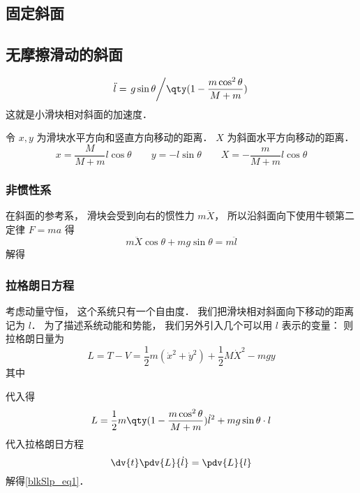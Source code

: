 
\subsection{固定斜面}

\subsection{无摩擦滑动的斜面}
\begin{equation}\label{blkSlp_eq1}
\ddot l = \left.g\sin\theta\middle/\qty(1 - \frac{m\cos^2\theta}{M + m})\right.
\end{equation}
这就是小滑块相对斜面的加速度．

令 $x, y$ 为滑块水平方向和竖直方向移动的距离． $X$ 为斜面水平方向移动的距离．
\begin{equation}
x = \frac{M}{M + m}l\cos\theta
\qquad
y = -l\sin\theta
\qquad
X = -\frac{m}{M + m}l\cos\theta
\end{equation}

\subsubsection{非惯性系}
在斜面的参考系， 滑块会受到向右的惯性力 $m\ddot X$， 所以沿斜面向下使用牛顿第二定律 $F = ma$ 得
\begin{equation}
m\ddot X\cos\theta + mg\sin\theta = m\ddot l
\end{equation}
解得

\subsubsection{拉格朗日方程}
考虑动量守恒， 这个系统只有一个自由度． 我们把滑块相对斜面向下移动的距离记为 $l$． 为了描述系统动能和势能， 我们另外引入几个可以用 $l$ 表示的变量：  则拉格朗日量为
\begin{equation}
L = T - V = \frac12 m(\dot x^2 + \dot y^2) + \frac12 M \dot X^2 - mgy
\end{equation}
其中

代入得
\begin{equation}
L = \frac{1}{2}m \qty(1 - \frac{m\cos^2\theta}{M + m}) \dot l^2 + mg\sin\theta \cdot l
\end{equation}
代入拉格朗日方程
\begin{equation}
\dv{t} \pdv{L}{\dot l} = \pdv{L}{l}
\end{equation}
解得\autoref{blkSlp_eq1}．
